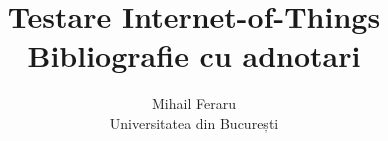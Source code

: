 \documentclass [11pt]{article}
\title{Testare Internet-of-Things\\\medskip Bibliografie cu adnotari}
\author{Mihail Feraru\\Universitatea din București}
\begin{document}
\maketitle
\nocite{*}


\end{document}
